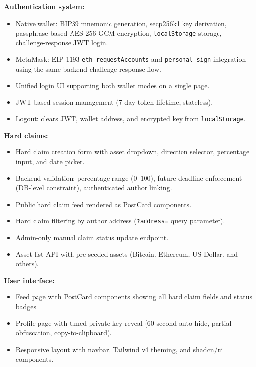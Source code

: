 \documentclass[a4paper,12pt]{report}
\begin{document}
\textbf{Authentication system:}
\begin{itemize}
    \item Native wallet: BIP39 mnemonic generation, secp256k1 key derivation, passphrase-based AES-256-GCM encryption, \texttt{localStorage} storage, challenge-response JWT login.
    \item MetaMask: EIP-1193 \texttt{eth\_requestAccounts} and \texttt{personal\_sign} integration using the same backend challenge-response flow.
    \item Unified login UI supporting both wallet modes on a single page.
    \item JWT-based session management (7-day token lifetime, stateless).
    \item Logout: clears JWT, wallet address, and encrypted key from \linebreak[4]\texttt{localStorage}.
\end{itemize}

\textbf{Hard claims:}
\begin{itemize}
    \item Hard claim creation form with asset dropdown, direction selector, percentage input, and date picker.
    \item Backend validation: percentage range (0--100), future deadline enforcement (DB-level constraint), authenticated author linking.
    \item Public hard claim feed rendered as PostCard components.
    \item Hard claim filtering by author address (\texttt{?address=} query parameter).
    \item Admin-only manual claim status update endpoint.
    \item Asset list API with pre-seeded assets (Bitcoin, Ethereum, US Dollar, and others).
\end{itemize}

\textbf{User interface:}
\begin{itemize}
    \item Feed page with PostCard components showing all hard claim fields and status badges.
    \item Profile page with timed private key reveal (60-second auto-hide, partial obfuscation, copy-to-clipboard).
    \item Responsive layout with navbar, Tailwind v4 theming, and shadcn/ui components.
\end{itemize}
\end{document}
